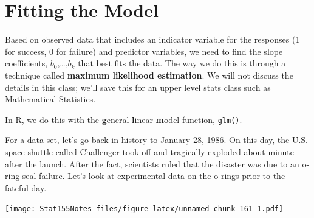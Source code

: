 \documentclass[]{book}
\newenvironment{Shaded}{\begin{snugshade}}{\end{snugshade}}
\newcommand{\DataTypeTok}[1]{\textcolor[rgb]{0.13,0.29,0.53}{#1}}
\newcommand{\KeywordTok}[1]{\textcolor[rgb]{0.13,0.29,0.53}{\textbf{#1}}}
\newcommand{\NormalTok}[1]{#1}
\newcommand{\OperatorTok}[1]{\textcolor[rgb]{0.81,0.36,0.00}{\textbf{#1}}}
\newcommand{\StringTok}[1]{\textcolor[rgb]{0.31,0.60,0.02}{#1}}
\begin{document}
\hypertarget{fitting-the-model}{%
\section{Fitting the Model}\label{fitting-the-model}}

Based on observed data that includes an indicator variable for the responses (1 for success, 0 for failure) and predictor variables, we need to find the slope coefficients, \(b_0\),\ldots{},\(b_k\) that best fits the data. The way we do this is through a technique called \textbf{maximum likelihood estimation}. We will not discuss the details in this class; we'll save this for an upper level stats class such as Mathematical Statistics.

In R, we do this with the \textbf{g}eneral \textbf{l}inear \textbf{m}odel function, \texttt{glm()}.

For a data set, let's go back in history to January 28, 1986. On this day, the U.S. space shuttle called Challenger took off and tragically exploded about minute after the launch. After the fact, scientists ruled that the disaster was due to an o-ring seal failure. Let's look at experimental data on the o-rings prior to the fateful day.

\begin{Shaded}
\end{Shaded}

\texttt{[image: Stat155Notes\_files/figure-latex/unnamed-chunk-161-1.pdf]}

\begin{Shaded}
\end{Shaded}
\end{document}
